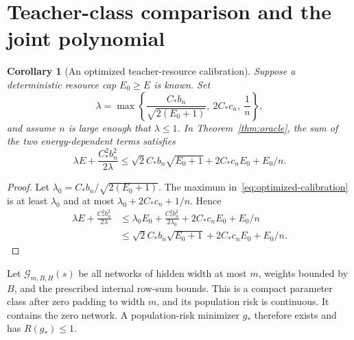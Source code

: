 \documentclass[11pt]{article}
\newtheorem{corollary}[theorem]{Corollary}
\theoremstyle{definition}\newtheorem{definition}[theorem]{Definition}
\theoremstyle{remark}\newtheorem{remark}[theorem]{Remark}
\begin{document}
\section{Teacher-class comparison and the joint polynomial}

\begin{corollary}[An optimized teacher-resource calibration]
\label{cor:optimized}
Suppose a deterministic resource cap $E_0\geq E$ is known. Set
\begin{equation}
 \lambda=\max\left\{
       \frac{C_*b_n}{\sqrt{2(E_0+1)}},\ 2C_*c_n,\ \frac1n\right\},
 \label{eq:optimized-calibration}
\end{equation}
and assume $n$ is large enough that $\lambda\leq1$. In Theorem~\ref{thm:oracle}, the sum of the two energy-dependent terms satisfies
\begin{equation}
 \lambda E+\frac{C_*^2b_n^2}{2\lambda}
 \leq\sqrt2 C_*b_n\sqrt{E_0+1}+2C_*c_nE_0+E_0/n.
 \label{eq:optimized-cost}
\end{equation}
\end{corollary}
\begin{proof}
Let $\lambda_0=C_*b_n/\sqrt{2(E_0+1)}$. The maximum in~\eqref{eq:optimized-calibration} is at least $\lambda_0$ and at most $\lambda_0+2C_*c_n+1/n$. Hence
\begin{align*}
 \lambda E+\frac{C_*^2b_n^2}{2\lambda}
 &\leq\lambda_0E_0+\frac{C_*^2b_n^2}{2\lambda_0}
                 +2C_*c_nE_0+E_0/n\\
 &\leq\sqrt2 C_*b_n\sqrt{E_0+1}+2C_*c_nE_0+E_0/n.
\end{align*}
\end{proof}

Let $\mathcal G_{m,B,H}(s)$ be all networks of hidden width at most $m$, weights bounded by $B$, and the prescribed internal row-sum bounds. This is a compact parameter class after zero padding to width $m$, and its population risk is continuous. It contains the zero network. A population-risk minimizer $g_*$ therefore exists and has $R(g_*)\leq1$.
\end{document}
